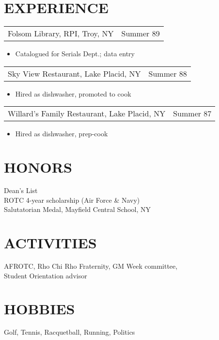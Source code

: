 \begin{resume}
\section{EXPERIENCE}      
                  \begin{tabular}{p{3in} r} %
                  Folsom Library, RPI, Troy, NY &  Summer 89 
                  \end{tabular}	
                   \begin{itemize} %
                    \item[] Catalogued for Serials Dept.; data entry 
		   \end{itemize} 
		 \begin{tabular}{p{3in} r}
                  Sky View Restaurant, Lake Placid, NY &  Summer 88 
                 \end{tabular}	
		  \begin{itemize}
                   \item[] Hired as dishwasher, promoted to cook 
                  \end{itemize}
                 \begin{tabular}{p{3in} r} %
                  Willard's Family Restaurant, Lake Placid, NY &  Summer 87
                 \end{tabular}
                  \begin{itemize}					        
                   \item[] Hired as dishwasher, prep-cook 
                  \end{itemize}
\section{HONORS} Dean's List \\
                 ROTC 4-year scholarship (Air Force \& Navy) \\
                 Salutatorian Medal, Mayfield Central School, NY 
 
\section{ACTIVITIES}
                AFROTC, Rho Chi Rho Fraternity, GM Week 
                committee, \\
                Student Orientation advisor 
 
\section{HOBBIES}         Golf, Tennis, Racquetball, Running, Politics 
 
\end{resume} 










